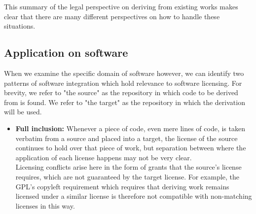 This summary of the legal perspective on deriving from existing works makes clear that there are many different perspectives on how to handle these situations.

\subsection{Application on software}

When we examine the specific domain of software however, we can identify two patterns of software integration which hold relevance to software licensing. For brevity, we refer to "the source" as the repository in which code to be derived from is found. We refer to "the target" as the repository in which the derivation will be used.

\begin{itemize}
	\item \textbf{Full inclusion:} Whenever a piece of code, even mere lines of code, is taken verbatim from a source and placed into a target, the license of the source continues to hold over that piece of work, but separation between where the application of each license happens may not be very clear. \\
	
	Licensing conflicts arise here in the form of grants that the source's license requires, which are not guaranteed by the target license. For example, the GPL's copyleft requirement which requires that deriving work remains licensed under a similar license is therefore not compatible with non-matching licenses in this way.
	

\end{itemize}
